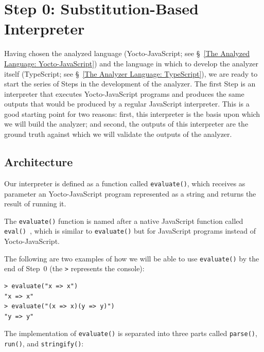 \documentclass[12pt, oneside]{book}
\begin{document}
\section{Step 0: Substitution-Based Interpreter}
\label{Step 0: Substitution-Based Interpreter}

Having chosen the analyzed language (Yocto-JavaScript; see §~\ref{The Analyzed Language: Yocto-JavaScript}) and the language in which to develop the analyzer itself (TypeScript; see §~\ref{The Analyzer Language: TypeScript}), we are ready to start the series of Steps in the development of the analyzer. The first Step is an interpreter that executes Yocto-JavaScript programs and produces the same outputs that would be produced by a regular JavaScript interpreter. This is a good starting point for two reasons: first, this interpreter is the basis upon which we will build the analyzer; and second, the outputs of this interpreter are the ground truth against which we will validate the outputs of the analyzer.

\subsection{Architecture}
\label{Architecture}

Our interpreter is defined as a function called \texttt{evaluate()}, which receives as parameter an Yocto-JavaScript program represented as a string and returns the result of running it.

\begin{mdframed}[frametitle = {Advanced}]
The \texttt{evaluate()} function is named after a native JavaScript function called \texttt{eval()}~\cite{eval}, which is similar to \texttt{evaluate()} but for JavaScript programs instead of Yocto-JavaScript.
\end{mdframed}

The following are two examples of how we will be able to use \texttt{evaluate()} by the end of Step~0 (the \texttt{>} represents the console):

\begin{verbatim}
> evaluate("x => x")
"x => x"
> evaluate("(x => x)(y => y)")
"y => y"
\end{verbatim}

The implementation of \texttt{evaluate()} is separated into three parts called \texttt{parse()}, \texttt{run()}, and \texttt{stringify()}:
\end{document}
